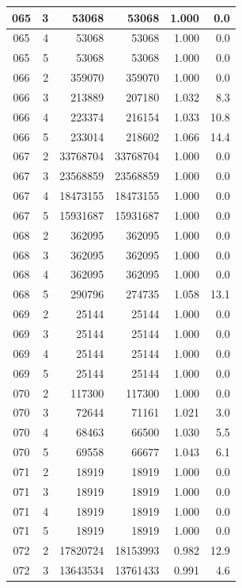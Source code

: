 \begin{longtable}{|c|r|r|r|r|r|}
\hline
065 & 3 & 53068 & 53068 & 1.000 & 0.0 \\
\hline
065 & 4 & 53068 & 53068 & 1.000 & 0.0 \\
\hline
065 & 5 & 53068 & 53068 & 1.000 & 0.0 \\
\hline
066 & 2 & 359070 & 359070 & 1.000 & 0.0 \\
\hline
066 & 3 & 213889 & 207180 & 1.032 & 8.3 \\
\hline
066 & 4 & 223374 & 216154 & 1.033 & 10.8 \\
\hline
066 & 5 & 233014 & 218602 & 1.066 & 14.4 \\
\hline
067 & 2 & 33768704 & 33768704 & 1.000 & 0.0 \\
\hline
067 & 3 & 23568859 & 23568859 & 1.000 & 0.0 \\
\hline
067 & 4 & 18473155 & 18473155 & 1.000 & 0.0 \\
\hline
067 & 5 & 15931687 & 15931687 & 1.000 & 0.0 \\
\hline
068 & 2 & 362095 & 362095 & 1.000 & 0.0 \\
\hline
068 & 3 & 362095 & 362095 & 1.000 & 0.0 \\
\hline
068 & 4 & 362095 & 362095 & 1.000 & 0.0 \\
\hline
068 & 5 & 290796 & 274735 & 1.058 & 13.1 \\
\hline
069 & 2 & 25144 & 25144 & 1.000 & 0.0 \\
\hline
069 & 3 & 25144 & 25144 & 1.000 & 0.0 \\
\hline
069 & 4 & 25144 & 25144 & 1.000 & 0.0 \\
\hline
069 & 5 & 25144 & 25144 & 1.000 & 0.0 \\
\hline
070 & 2 & 117300 & 117300 & 1.000 & 0.0 \\
\hline
070 & 3 & 72644 & 71161 & 1.021 & 3.0 \\
\hline
070 & 4 & 68463 & 66500 & 1.030 & 5.5 \\
\hline
070 & 5 & 69558 & 66677 & 1.043 & 6.1 \\
\hline
071 & 2 & 18919 & 18919 & 1.000 & 0.0 \\
\hline
071 & 3 & 18919 & 18919 & 1.000 & 0.0 \\
\hline
071 & 4 & 18919 & 18919 & 1.000 & 0.0 \\
\hline
071 & 5 & 18919 & 18919 & 1.000 & 0.0 \\
\hline
072 & 2 & 17820724 & 18153993 & 0.982 & 12.9 \\
\hline
072 & 3 & 13643534 & 13761433 & 0.991 & 4.6 \\

\end{longtable}
